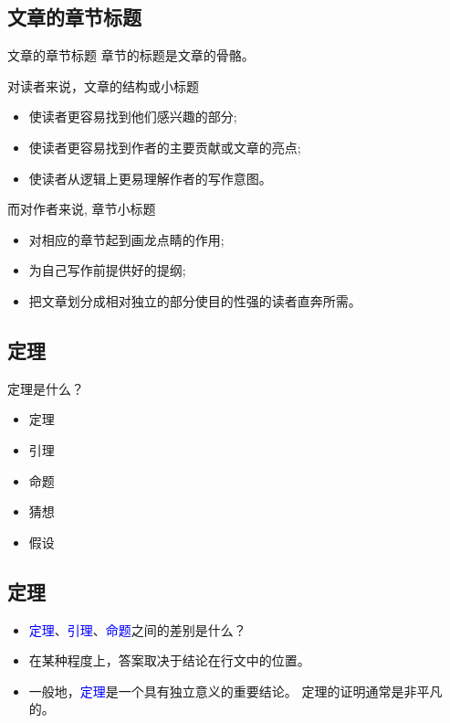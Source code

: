 \documentclass[13pt]{ctexbeamer}
\newcommand{\blue}[1]{\textcolor{blue}{#1}}
\begin{document}
\subsection{文章的章节标题}
\begin{frame}{文章的章节标题}
章节的标题是文章的骨骼。

对读者来说，文章的结构或小标题

\begin{itemize}
    \item  使读者更容易找到他们感兴趣的部分;
\item 使读者更容易找到作者的主要贡献或文章的亮点;
\item 使读者从逻辑上更易理解作者的写作意图。
\end{itemize}


而对作者来说, 章节小标题
\begin{itemize}
    \item  对相应的章节起到画龙点睛的作用;

\item 为自己写作前提供好的提纲;

\item 把文章划分成相对独立的部分使目的性强的读者直奔所需。
\end{itemize}
\end{frame}


\subsection{定理}
\begin{frame}{定理是什么？}

	
\begin{itemize}
	\item 定理
	\item 引理
	\item 命题
	\item 猜想
	\item 假设
\end{itemize}
\end{frame}

\subsection{定理}
\begin{frame}
\begin{itemize}
\item \blue{定理}、\blue{引理}、\blue{命题}之间的差别是什么？
\item 在某种程度上，答案取决于结论在行文中的位置。
\item 
一般地，\blue{定理}是一个具有独立意义的重要结论。
定理的证明通常是非平凡的。


\end{itemize}
\end{frame}
\end{document}
